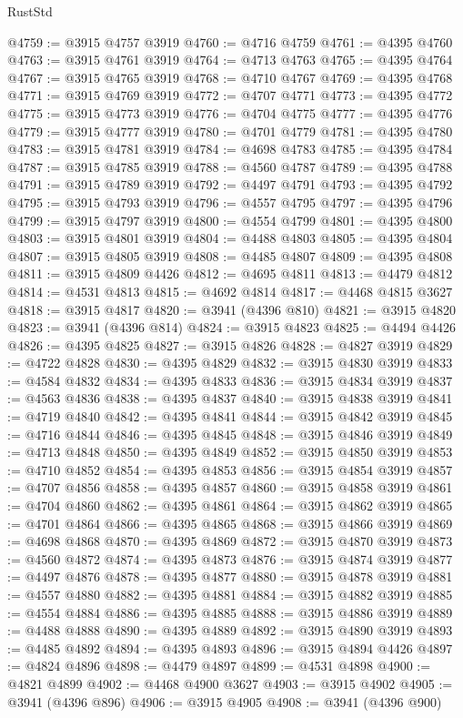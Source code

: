 \begin{lexlean}{RustStd}
\begin{coremodule}
@4759 := @3915 @4757 @3919
@4760 := @4716 @4759
@4761 := @4395 @4760
@4763 := @3915 @4761 @3919
@4764 := @4713 @4763
@4765 := @4395 @4764
@4767 := @3915 @4765 @3919
@4768 := @4710 @4767
@4769 := @4395 @4768
@4771 := @3915 @4769 @3919
@4772 := @4707 @4771
@4773 := @4395 @4772
@4775 := @3915 @4773 @3919
@4776 := @4704 @4775
@4777 := @4395 @4776
@4779 := @3915 @4777 @3919
@4780 := @4701 @4779
@4781 := @4395 @4780
@4783 := @3915 @4781 @3919
@4784 := @4698 @4783
@4785 := @4395 @4784
@4787 := @3915 @4785 @3919
@4788 := @4560 @4787
@4789 := @4395 @4788
@4791 := @3915 @4789 @3919
@4792 := @4497 @4791
@4793 := @4395 @4792
@4795 := @3915 @4793 @3919
@4796 := @4557 @4795
@4797 := @4395 @4796
@4799 := @3915 @4797 @3919
@4800 := @4554 @4799
@4801 := @4395 @4800
@4803 := @3915 @4801 @3919
@4804 := @4488 @4803
@4805 := @4395 @4804
@4807 := @3915 @4805 @3919
@4808 := @4485 @4807
@4809 := @4395 @4808
@4811 := @3915 @4809 @4426
@4812 := @4695 @4811
@4813 := @4479 @4812
@4814 := @4531 @4813
@4815 := @4692 @4814
@4817 := @4468 @4815 @3627
@4818 := @3915 @4817
@4820 := @3941 (@4396 @810)
@4821 := @3915 @4820
@4823 := @3941 (@4396 @814)
@4824 := @3915 @4823
@4825 := @4494 @4426
@4826 := @4395 @4825
@4827 := @3915 @4826
@4828 := @4827 @3919
@4829 := @4722 @4828
@4830 := @4395 @4829
@4832 := @3915 @4830 @3919
@4833 := @4584 @4832
@4834 := @4395 @4833
@4836 := @3915 @4834 @3919
@4837 := @4563 @4836
@4838 := @4395 @4837
@4840 := @3915 @4838 @3919
@4841 := @4719 @4840
@4842 := @4395 @4841
@4844 := @3915 @4842 @3919
@4845 := @4716 @4844
@4846 := @4395 @4845
@4848 := @3915 @4846 @3919
@4849 := @4713 @4848
@4850 := @4395 @4849
@4852 := @3915 @4850 @3919
@4853 := @4710 @4852
@4854 := @4395 @4853
@4856 := @3915 @4854 @3919
@4857 := @4707 @4856
@4858 := @4395 @4857
@4860 := @3915 @4858 @3919
@4861 := @4704 @4860
@4862 := @4395 @4861
@4864 := @3915 @4862 @3919
@4865 := @4701 @4864
@4866 := @4395 @4865
@4868 := @3915 @4866 @3919
@4869 := @4698 @4868
@4870 := @4395 @4869
@4872 := @3915 @4870 @3919
@4873 := @4560 @4872
@4874 := @4395 @4873
@4876 := @3915 @4874 @3919
@4877 := @4497 @4876
@4878 := @4395 @4877
@4880 := @3915 @4878 @3919
@4881 := @4557 @4880
@4882 := @4395 @4881
@4884 := @3915 @4882 @3919
@4885 := @4554 @4884
@4886 := @4395 @4885
@4888 := @3915 @4886 @3919
@4889 := @4488 @4888
@4890 := @4395 @4889
@4892 := @3915 @4890 @3919
@4893 := @4485 @4892
@4894 := @4395 @4893
@4896 := @3915 @4894 @4426
@4897 := @4824 @4896
@4898 := @4479 @4897
@4899 := @4531 @4898
@4900 := @4821 @4899
@4902 := @4468 @4900 @3627
@4903 := @3915 @4902
@4905 := @3941 (@4396 @896)
@4906 := @3915 @4905
@4908 := @3941 (@4396 @900)

\end{coremodule}
\end{lexlean}
